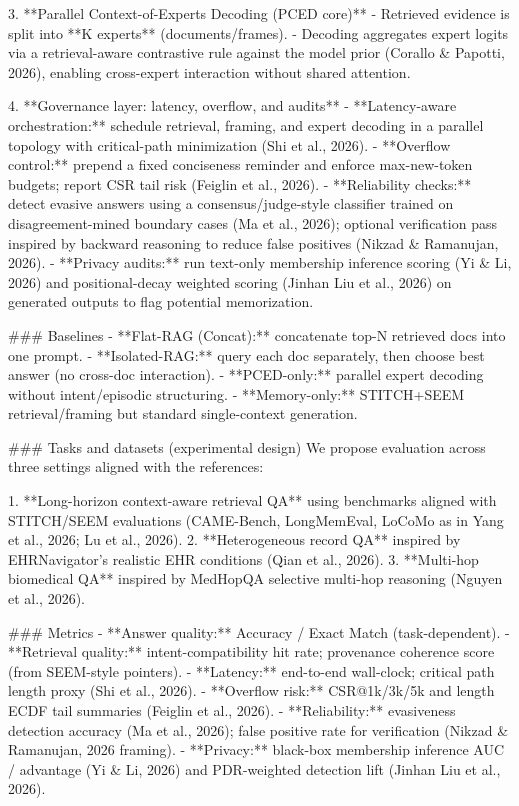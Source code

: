 3. **Parallel Context-of-Experts Decoding (PCED core)**  
   - Retrieved evidence is split into **K experts** (documents/frames).  
   - Decoding aggregates expert logits via a retrieval-aware contrastive rule against the model prior (Corallo & Papotti, 2026), enabling cross-expert interaction without shared attention.

4. **Governance layer: latency, overflow, and audits**  
   - **Latency-aware orchestration:** schedule retrieval, framing, and expert decoding in a parallel topology with critical-path minimization (Shi et al., 2026).  
   - **Overflow control:** prepend a fixed conciseness reminder and enforce max-new-token budgets; report CSR tail risk (Feiglin et al., 2026).  
   - **Reliability checks:** detect evasive answers using a consensus/judge-style classifier trained on disagreement-mined boundary cases (Ma et al., 2026); optional verification pass inspired by backward reasoning to reduce false positives (Nikzad & Ramanujan, 2026).  
   - **Privacy audits:** run text-only membership inference scoring (Yi & Li, 2026) and positional-decay weighted scoring (Jinhan Liu et al., 2026) on generated outputs to flag potential memorization.

### Baselines  
- **Flat-RAG (Concat):** concatenate top-N retrieved docs into one prompt.  
- **Isolated-RAG:** query each doc separately, then choose best answer (no cross-doc interaction).  
- **PCED-only:** parallel expert decoding without intent/episodic structuring.  
- **Memory-only:** STITCH+SEEM retrieval/framing but standard single-context generation.

### Tasks and datasets (experimental design)  
We propose evaluation across three settings aligned with the references:

1. **Long-horizon context-aware retrieval QA** using benchmarks aligned with STITCH/SEEM evaluations (CAME-Bench, LongMemEval, LoCoMo as in Yang et al., 2026; Lu et al., 2026).  
2. **Heterogeneous record QA** inspired by EHRNavigator’s realistic EHR conditions (Qian et al., 2026).  
3. **Multi-hop biomedical QA** inspired by MedHopQA selective multi-hop reasoning (Nguyen et al., 2026).

### Metrics  
- **Answer quality:** Accuracy / Exact Match (task-dependent).  
- **Retrieval quality:** intent-compatibility hit rate; provenance coherence score (from SEEM-style pointers).  
- **Latency:** end-to-end wall-clock; critical path length proxy (Shi et al., 2026).  
- **Overflow risk:** CSR@1k/3k/5k and length ECDF tail summaries (Feiglin et al., 2026).  
- **Reliability:** evasiveness detection accuracy (Ma et al., 2026); false positive rate for verification (Nikzad & Ramanujan, 2026 framing).  
- **Privacy:** black-box membership inference AUC / advantage (Yi & Li, 2026) and PDR-weighted detection lift (Jinhan Liu et al., 2026).

